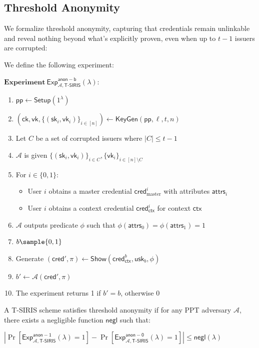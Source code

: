 \subsection{Threshold Anonymity}

We formalize threshold anonymity, capturing that credentials remain unlinkable and reveal nothing beyond what's explicitly proven, even when up to $t-1$ issuers are corrupted:

\begin{definition}
We define the following experiment:

$\textbf{Experiment}~\mathsf{Exp}^{\mathsf{anon-b}}_{\mathcal{A},\mathsf{T\text{-}SIRIS}}(\lambda):$
\begin{enumerate}
    \item $\mathsf{pp} \leftarrow \mathsf{Setup}(1^\lambda)$
    \item $(\mathsf{ck}, \mathsf{vk}, \{(\mathsf{sk}_i, \mathsf{vk}_i)\}_{i\in[n]}) \leftarrow \mathsf{KeyGen}(\mathsf{pp}, \ell, t, n)$
    \item Let $C$ be a set of corrupted issuers where $|C| \leq t-1$
    \item $\mathcal{A}$ is given $\{(\mathsf{sk}_i, \mathsf{vk}_i)\}_{i\in C}, \{\mathsf{vk}_i\}_{i\in[n]\setminus C}$
    \item For $i \in \{0,1\}$:
    \begin{itemize}
        \item User $i$ obtains a master credential $\mathsf{cred}_{\text{master}}^i$ with attributes $\mathsf{attrs}_i$
        \item User $i$ obtains a context credential $\mathsf{cred}_{\mathsf{ctx}}^i$ for context $\mathsf{ctx}$
    \end{itemize}
    \item $\mathcal{A}$ outputs predicate $\phi$ such that $\phi(\mathsf{attrs}_0) = \phi(\mathsf{attrs}_1) = 1$
    \item $b \sample \{0,1\}$
    \item Generate $(\mathsf{cred}', \pi) \leftarrow \mathsf{Show}(\mathsf{cred}_{\mathsf{ctx}}^b, \mathsf{usk}_b, \phi)$
    \item $b' \leftarrow \mathcal{A}(\mathsf{cred}', \pi)$
    \item The experiment returns 1 if $b' = b$, otherwise 0
\end{enumerate}

A T-SIRIS scheme satisfies threshold anonymity if for any PPT adversary $\mathcal{A}$, there exists a negligible function $\mathsf{negl}$ such that:

$\left|\Pr[\mathsf{Exp}^{\mathsf{anon-1}}_{\mathcal{A},\mathsf{T\text{-}SIRIS}}(\lambda) = 1] - \Pr[\mathsf{Exp}^{\mathsf{anon-0}}_{\mathcal{A},\mathsf{T\text{-}SIRIS}}(\lambda) = 1]\right| \leq \mathsf{negl}(\lambda)$
\end{definition}











